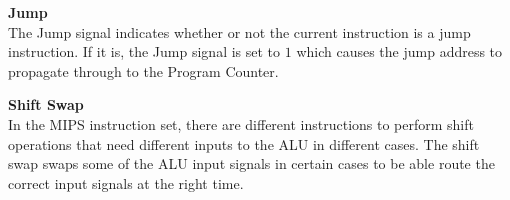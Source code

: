 \begin{description}
\item{\textbf{Jump}} \\
The Jump signal indicates whether or not the current instruction is a jump instruction.
If it is, the Jump signal is set to $ 1 $ which causes the jump address to propagate through to the Program Counter.

\item{\textbf{Shift Swap}} \\
In the MIPS instruction set, there are different instructions to perform shift operations that need different inputs to the ALU in different cases.
The shift swap swaps some of the ALU input signals in certain cases to be able route the correct input signals at the right time.
\end{description}
